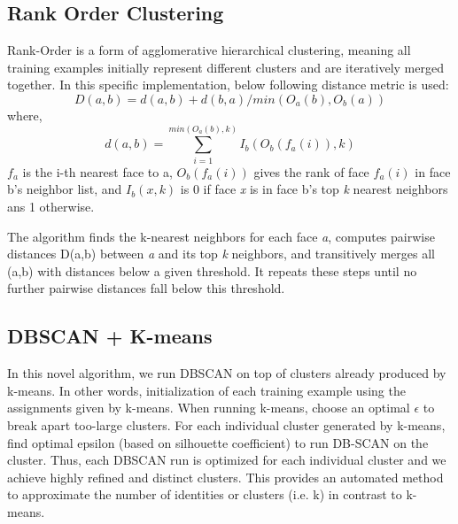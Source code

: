 \documentclass[a4paper,12pt, twoside]{NITKReport}
\begin{document}
\subsection{Rank Order Clustering}
\par Rank-Order is a form of agglomerative hierarchical clustering, meaning all training examples initially represent different clusters and are iteratively merged together. In this specific implementation, below following distance metric is used:
\begin{equation}
D(a,b) = d(a,b) + d(b,a)/ min(O_{a}(b),O_{b}(a))
\end{equation}
where,
\begin{equation}
d(a,b) = \sum_{i=1}^{min(O_{a}(b),k)} I_{b}(O_{b}(f_{a}(i)),k)
\end{equation}
$f_{a}$ is the i-th nearest face to a, $O_{b}(f_{a}(i))$ gives the rank of face $f_{a}(i)$ in face b's neighbor list, and $I_{b}(x,k)$ is 0 if face \textit{x} is in face b's top \textit{k} nearest neighbors ans 1 otherwise.

\par The  algorithm finds the k-nearest neighbors for each face \textit{a}, computes pairwise distances D(a,b) between \textit{a} and its top \textit{k} neighbors, and transitively merges all (a,b) with distances below a given threshold. It repeats
these steps until no further pairwise distances fall below this threshold.

\subsection{DBSCAN + K-means}
\par In this novel algorithm, we run DBSCAN on top of clusters already produced by
k-means.  In other words, initialization of each training example using the assignments given by k-means. When running k-means, choose an optimal $\epsilon$
to break apart too-large clusters.  For each individual cluster generated by
k-means, find optimal epsilon (based on silhouette coefficient) to run DB-SCAN on the cluster. Thus, each DBSCAN run is optimized for each individual cluster  and we achieve highly refined and distinct clusters. This provides an automated method to approximate the number of identities or clusters (i.e. k) in contrast to k-means.
\end{document}

